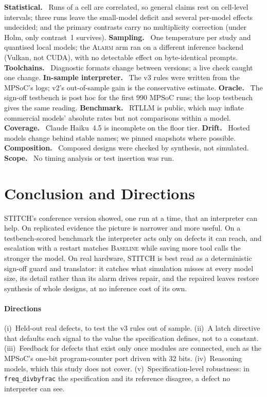 \documentclass[11pt]{article}
\newcommand{\cname}[1]{\textsc{#1}}
\newcommand{\Base}{\cname{Baseline}}
\newcommand{\Alarm}{\cname{Alarm}}
\newcommand{\runin}[1]{\textbf{\sffamily #1.}\ }
\begin{document}
\runin{Statistical} Runs of a cell are correlated, so general claims rest on
cell-level intervals; three runs leave the small-model deficit and several
per-model effects undecided; and the primary contrasts carry no multiplicity
correction (under Holm, only contrast~1 survives). \runin{Sampling} One
temperature per study and quantised local models; the
\Alarm{} arm ran on a different inference backend (Vulkan, not CUDA), with no
detectable effect on byte-identical prompts. \runin{Toolchains} Diagnostic
formats change between versions; a live check caught one change.
\runin{In-sample interpreter} The v3 rules were written from the MPSoC's logs;
v2's out-of-sample gain is the conservative estimate. \runin{Oracle} The
sign-off testbench is post hoc for the first $990$ MPSoC runs; the loop
testbench gives the same reading. \runin{Benchmark} RTLLM is public, which may
inflate commercial models' absolute rates but not comparisons within a model.
\runin{Coverage} Claude Haiku~4.5 is incomplete on the floor tier.
\runin{Drift} Hosted models change behind stable names; we pinned snapshots
where possible. \runin{Composition} Composed
designs were checked by synthesis, not simulated. \runin{Scope} No timing
analysis or test insertion was run.

\section{Conclusion and Directions}
\label{sec:conclusion}

STITCH's conference version showed, one run at a time, that an interpreter can
help. On replicated evidence the picture is narrower and more useful. On a
testbench-scored benchmark the interpreter acts only on defects it can reach,
and escalation with a restart matches \Base{} while saving more tool calls the
stronger the model. On real hardware, STITCH is best read as a deterministic
sign-off guard and translator: it catches what simulation misses at every model
size, its detail rather than its alarm drives repair, and the repaired leaves
restore synthesis of whole designs, at no inference cost of its own.

\paragraph{Directions} (i)~Held-out real defects, to test the v3 rules out of
sample. (ii)~A latch directive that defaults each signal to the value the
specification defines, not to a constant. (iii)~Feedback for defects that exist
only once modules are connected, such as the MPSoC's one-bit program-counter
port driven with $32$ bits. (iv)~Reasoning models, which this study does not
cover. (v)~Specification-level robustness: in \texttt{freq\_divbyfrac} the
specification and its reference disagree, a defect no interpreter can see.
\end{document}
